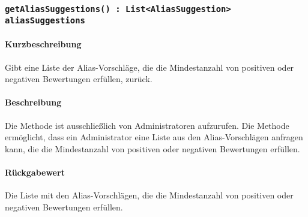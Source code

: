 \subsubsection{\texttt{getAliasSuggestions() : List<AliasSuggestion> aliasSuggestions}}%
\paragraph*{Kurzbeschreibung}
Gibt eine Liste der Alias-Vorschläge, die die Mindestanzahl von positiven oder negativen Bewertungen erfüllen, zurück.
\paragraph*{Beschreibung}
Die Methode ist ausschließlich von Administratoren aufzurufen.
Die Methode ermöglicht, dass ein Administrator eine Liste aus den Alias-Vorschlägen anfragen kann, die die Mindestanzahl von positiven oder negativen Bewertungen erfüllen.
\paragraph*{Rückgabewert}
Die Liste mit den Alias-Vorschlägen, die die Mindestanzahl von positiven oder negativen Bewertungen erfüllen.
